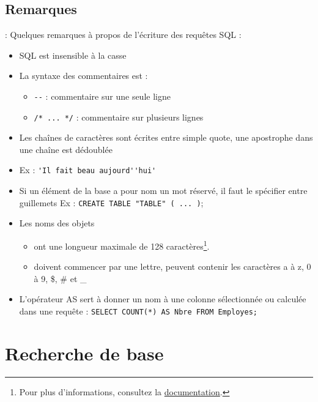 \documentclass[10pt]{beamer}
\begin{document}
\subsection{Remarques}
\begin{frame}[allowframebreaks]{\secname : \subsecname}
    Quelques remarques à propos de l'écriture des requêtes SQL :
    \begin{itemize}
        \item SQL est insensible à la casse
        \item La syntaxe des commentaires est :
              \begin{itemize}
                  \item  \lstinline[language=plsql]!--! : commentaire sur une seule ligne
                  \item  \lstinline[language=plsql]!/* ... */! : commentaire sur plusieurs lignes
              \end{itemize}

        \item Les chaînes de caractères sont écrites entre simple quote, une apostrophe dans une chaîne est dédoublée
        \item Ex : \lstinline[language=plsql]!'Il fait beau aujourd''hui'!
        \item  Si un élément de la base a pour nom un mot réservé, il faut le spécifier entre guillemets
              Ex : \lstinline[language=plsql]!CREATE TABLE "TABLE" ( ... )!;
        \item Les noms des objets
              \begin{itemize}
                  \item ont une longueur maximale de 128 caractères\footnote{Pour plus d'informations, consultez la \href{https://docs.oracle.com/en/database/oracle/oracle-database/12.2/refrn/ALL_OBJECTS.html\#GUID-AA6DEF8B-F04F-482A-8440-DBCB18F6C976}{documentation}.}.
                  \item doivent commencer par une lettre, peuvent contenir les caractères a à z, 0 à 9, \$, \# et \_
              \end{itemize}
        \item L'opérateur AS sert à donner un nom à une colonne sélectionnée ou calculée dans une requête : \lstinline[language=plsql]!SELECT COUNT(*) AS Nbre FROM Employes;!
    \end{itemize}
\end{frame}

\section{Recherche de base}
\tocss
\end{document}
